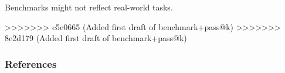 \documentclass[11pt]{article}
\begin{document}

Benchmarks might not reflect real-world tasks.


>>>>>>> c5e0665 (Added first draft of benchmark+pass@k)
>>>>>>> 8e2d179 (Added first draft of benchmark+pass@k)

\subsubsection{References}



\end{document}
